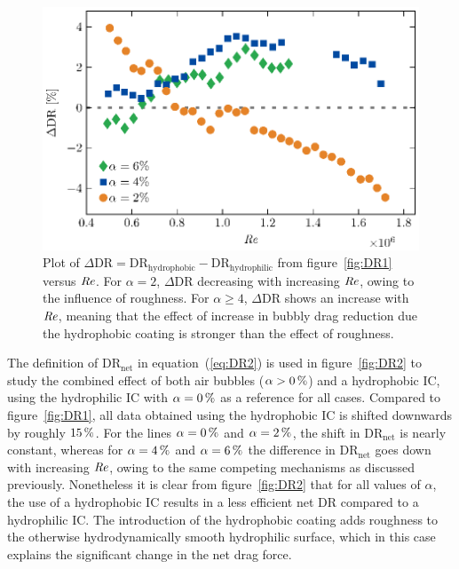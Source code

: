 \begin{figure}
\centering
\includegraphics{Figures/fig8}
\caption{Plot of $ \Delta\text{DR} = \text{DR}_\text{hydrophobic} - \text{DR}_\text{hydrophilic}$ from figure~\ref{fig:DR1} versus $\mbox{\textit{Re}}$. For $\alpha = 2$, $\Delta \text{DR}$ decreasing with increasing $\mbox{\textit{Re}}$, owing to the influence of roughness. For $\alpha \geq 4$, $\Delta \text{DR}$ shows an increase with $\mbox{\textit{Re}}$, meaning that the effect of increase in bubbly drag reduction due the hydrophobic coating is stronger than the effect of roughness.}\label{fig:deltaDR}
\end{figure}

The definition of DR$_\text{net}$ in equation~(\ref{eq:DR2}) is used in figure~\ref{fig:DR2} to study the combined effect of both air bubbles ($\alpha > \SI{0}{\percent}$) and a {hydrophobic} IC, using the hydrophilic IC with $\alpha = \SI{0}{\percent}$ as a reference for all cases. Compared to figure~\ref{fig:DR1}, all data obtained using the {hydrophobic} IC is shifted downwards by roughly $\SI{15}{\percent}$.  %
For the lines $\alpha = \SI{0}{\percent}$ and $\alpha = \SI{2}{\percent}$, the shift in DR$_\text{net}$ is nearly constant, whereas for $\alpha = \SI{4}{\percent}$ and $\alpha = \SI{6}{\percent}$ the difference in DR$_\text{net}$ goes down with increasing $\mbox{\textit{Re}}$, owing to the same competing mechanisms as discussed previously. Nonetheless it is clear from figure~\ref{fig:DR2} that for all values of $\alpha$, the use of a {hydrophobic} IC results in a less efficient net DR compared to a hydrophilic IC. The introduction of the {hydrophobic} coating adds roughness to the otherwise hydrodynamically smooth hydrophilic surface, which in this case explains the significant change in the net drag force.

